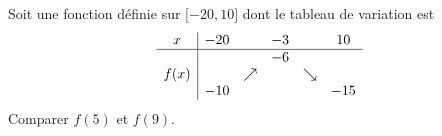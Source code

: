 
\begin{exercice}\label{exosmath-0209}

    Soit une fonction définie sur \( \mathopen[ -20 , 10 \mathclose]\) dont le tableau de variation est
\begin{equation*}
    \begin{array}[]{c|ccccc}
        x&-20&&-3&&10\\
        \hline
        &&&-6&&\\
        f(x)&&\nearrow&&\searrow&\\
        &-10&&&&-15
    \end{array}
\end{equation*}
Comparer \( f(5)\) et \( f(9)\).

\end{exercice}

